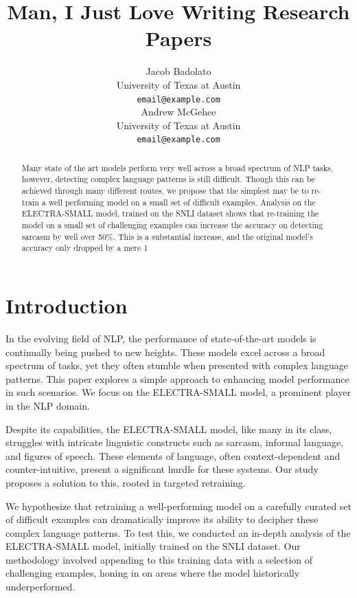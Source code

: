 \documentclass{article}
\title{Man, I Just Love Writing Research Papers}
\author{%
  Jacob Badolato \\
  University of Texas at Austin \\
  \texttt{email@example.com} \\
  \And
  Andrew McGehee \\
  University of Texas at Austin \\
  \texttt{email@example.com} \\
}
\begin{document}
\maketitle

\begin{abstract}
  Many state of the art models perform very well across a broad spectrum of NLP tasks, however, detecting complex language patterns is still difficult. Though this can be achieved through many different routes, we propose that the simplest may be to re-train a well performing model on a small set of difficult examples. Analysis on the ELECTRA-SMALL model, trained on the SNLI dataset shows that re-training the model on a small set of challenging examples can increase the accuracy on detecting sarcasm by well over 50\%. This is a substantial increase, and the original model’s accuracy only dropped by a mere 1%
\end{abstract}

\section{Introduction}
In the evolving field of NLP, the performance of state-of-the-art models is continually being pushed to new heights. 
These models excel across a broad spectrum of tasks, yet they often stumble when presented with complex language patterns. 
This paper explores a simple approach to enhancing model performance in such scenarios. We focus on the ELECTRA-SMALL model, 
a prominent player in the NLP domain.

Despite its capabilities, the ELECTRA-SMALL model, like many in its class, struggles with intricate linguistic constructs such as sarcasm, 
informal language, and figures of speech. These elements of language, often context-dependent and counter-intuitive, present a significant hurdle 
for these systems. Our study proposes a solution to this, rooted in targeted retraining.

We hypothesize that retraining a well-performing model on a carefully curated set of difficult examples can dramatically improve its ability 
to decipher these complex language patterns. To test this, we conducted an in-depth analysis of the ELECTRA-SMALL model, initially trained 
on the SNLI dataset. Our methodology involved appending to this training data with a selection of challenging examples, honing in on areas 
where the model historically underperformed.
\end{document}
